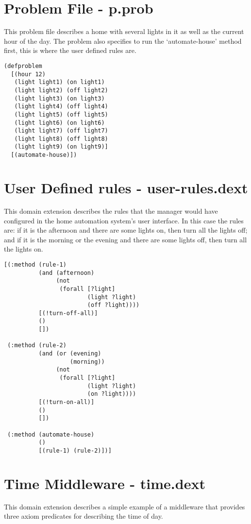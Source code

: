\section{Problem File - p.prob}
This problem file describes a home with several lights in it as well as the
current hour of the day. The problem also specifies to run the `automate-house'
method first, this is where the user defined rules are.

\begin{lstlisting}
(defproblem
  [(hour 12)
   (light light1) (on light1)
   (light light2) (off light2)
   (light light3) (on light3)
   (light light4) (off light4)
   (light light5) (off light5)
   (light light6) (on light6)
   (light light7) (off light7)
   (light light8) (off light8)
   (light light9) (on light9)]
  [(automate-house)])
\end{lstlisting}

\section{User Defined rules - user-rules.dext}
This domain extension describes the rules that the manager would have configured
in the home automation system's user interface. In this case the rules are: if
it is the afternoon and there are some lights on, then turn all the lights off;
and if it is the morning or the evening and there are some lights off, then turn
all the lights on.

\begin{lstlisting}
[(:method (rule-1)
          (and (afternoon)
               (not
                (forall [?light]
                        (light ?light)
                        (off ?light))))
          [(!turn-off-all)]
          ()
          [])

 (:method (rule-2)
          (and (or (evening)
                   (morning))
               (not
                (forall [?light]
                        (light ?light)
                        (on ?light))))
          [(!turn-on-all)]
          ()
          [])

 (:method (automate-house)
          ()
          [(rule-1) (rule-2)])]
\end{lstlisting}

\section{Time Middleware - time.dext}
This domain extension describes a simple example of a middleware that provides
three axiom predicates for describing the time of day.

